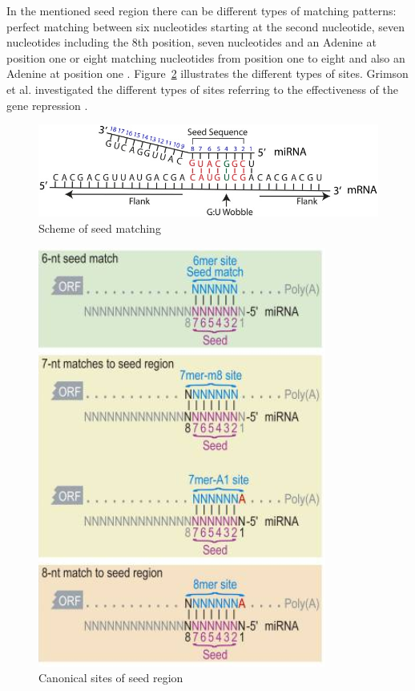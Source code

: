 \documentclass[12pt]{article}
\begin{document}
In the mentioned seed region there can be different types of matching patterns: perfect matching between six nucleotides starting at the second nucleotide, seven nucleotides including the 8th position, seven nucleotides and an Adenine at position one or eight matching nucleotides from position one to eight and also an Adenine at position one \cite{Grimson}. Figure~\ref{Fig:canonical} illustrates the different types of sites. Grimson et al. investigated the different types of sites referring to the effectiveness of the gene repression \cite{Grimson}. \\


\begin{figure}[h]
\centering
\includegraphics[scale=2.8]{results/seedmatching.png} 
\caption{Scheme of seed matching}
\label{seed}
\end{figure}


\begin{figure}[h]
\centering
\includegraphics[scale=0.6]{results/canonical_sites.png}
\caption{Canonical sites of seed region}
\label{Fig:canonical}
\end{figure}
\end{document}
